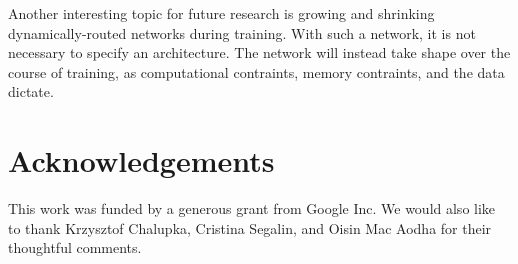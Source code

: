 \documentclass{article}
\begin{document}
  Another interesting topic for future research is growing and shrinking dynamically-routed networks during training. With such a network, it is not necessary to specify an architecture. The network will instead take shape over the course of training, as computational contraints, memory contraints, and the data dictate.

  \section*{Acknowledgements}
  
  This work was funded by a generous grant from Google Inc. We would also like to thank Krzysztof Chalupka, Cristina Segalin, and Oisin Mac Aodha for their thoughtful comments.

  
  
\end{document}
